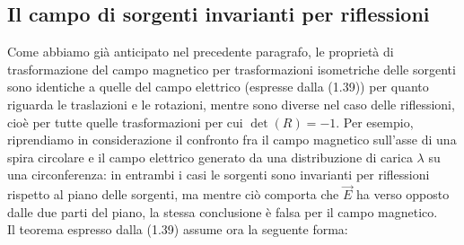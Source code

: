 \subsection{Il campo di sorgenti invarianti per riflessioni}

Come abbiamo gi\`a anticipato nel precedente paragrafo, le propriet\`a di
trasformazione del campo magnetico per trasformazioni isometriche delle sorgenti
sono identiche a quelle del campo elettrico \big(espresse dalla (1.39)\big) per
quanto riguarda le traslazioni e le rotazioni, mentre sono diverse nel caso
delle riflessioni, cio\`e per tutte quelle trasformazioni per cui $\det(R)=-1$.
Per esempio, riprendiamo in considerazione il confronto fra il campo magnetico
sull'asse di una spira circolare e il campo elettrico generato da una
distribuzione di carica $\lambda$ su una circonferenza: in entrambi i casi le
sorgenti sono invarianti per riflessioni rispetto al piano delle sorgenti, ma
mentre ci\`o comporta che $\vec E$ ha verso opposto dalle due parti del piano,
la stessa conclusione \`e falsa per il campo magnetico.\\
Il teorema espresso dalla (1.39) assume ora la seguente forma:

